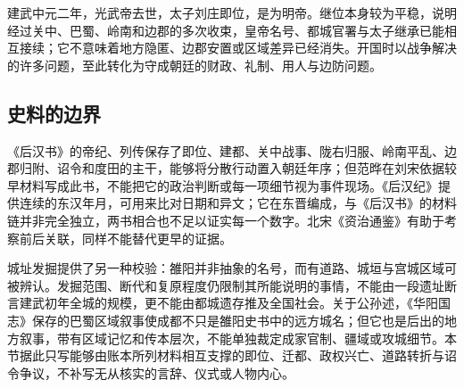 建武中元二年，光武帝去世，太子刘庄即位，是为明帝。继位本身较为平稳，说明经过关中、巴蜀、岭南和边郡的多次收束，皇帝名号、都城官署与太子继承已能相互接续；它不意味着地方隐匿、边郡安置或区域差异已经消失。开国时以战争解决的许多问题，至此转化为守成朝廷的财政、礼制、用人与边防问题。

\subsection{史料的边界}

《后汉书》的帝纪、列传保存了即位、建都、关中战事、陇右归服、岭南平乱、边郡归附、诏令和度田的主干，能够将分散行动置入朝廷年序；但范晔在刘宋依据较早材料写成此书，不能把它的政治判断或每一项细节视为事件现场。《后汉纪》提供连续的东汉年月，可用来比对日期和异文；它在东晋编成，与《后汉书》的材料链并非完全独立，两书相合也不足以证实每一个数字。北宋《资治通鉴》有助于考察前后关联，同样不能替代更早的证据。

城址发掘提供了另一种校验：雒阳并非抽象的名号，而有道路、城垣与宫城区域可被辨认。发掘范围、断代和复原程度仍限制其所能说明的事情，不能由一段遗址断言建武初年全城的规模，更不能由都城遗存推及全国社会。关于公孙述，《华阳国志》保存的巴蜀区域叙事使成都不只是雒阳史书中的远方城名；但它也是后出的地方叙事，带有区域记忆和传本层次，不能单独裁定成家官制、疆域或攻城细节。本节据此只写能够由账本所列材料相互支撑的即位、迁都、政权兴亡、道路转折与诏令争议，不补写无从核实的言辞、仪式或人物内心。
